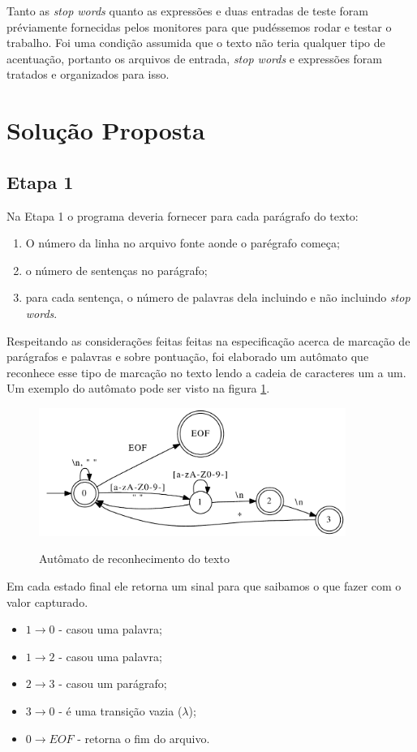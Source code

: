 \documentclass[12pt]{article}
\begin{document}
Tanto as \textit{stop words} quanto as expressões e duas entradas de teste foram préviamente fornecidas pelos monitores para que pudéssemos rodar e testar o trabalho. Foi uma condição assumida que o texto não teria qualquer tipo de acentuação, portanto os arquivos de entrada, \textit{stop words} e expressões foram tratados e organizados para isso.

\section{Solução Proposta}
\label{solucao_proposta}

\subsection{Etapa 1}
\label{etpu}
Na Etapa 1 o programa deveria fornecer para cada parágrafo do texto:
\begin{enumerate}
  \item O número da linha no arquivo fonte aonde o parégrafo começa;
  \item o número de sentenças no parágrafo;
  \item para cada sentença, o número de palavras dela incluindo e não incluindo \textit{stop words}.	
\end{enumerate}

Respeitando as considerações feitas feitas na especificação acerca de marcação de parágrafos e palavras e sobre pontuação, foi elaborado um autômato que reconhece esse tipo de marcação no texto lendo a cadeia de caracteres um a um. Um exemplo do autômato pode ser visto na figura \ref{img:automato}.

\begin{figure}[ht!]
\centering
\includegraphics[width=10.0cm]{automato.pdf}
\label{img:automato}
\caption{Autômato de reconhecimento do texto}
\end{figure}

Em cada estado final ele retorna um sinal para que saibamos o que fazer com o valor capturado.
\begin{itemize}
  \item $1 \longrightarrow 0$ - casou uma palavra;
  \item $1 \longrightarrow 2$ - casou uma palavra;
  \item $2 \longrightarrow 3$ - casou um parágrafo;
  \item $3 \longrightarrow 0$ - é uma transição vazia ($\lambda$);
  \item $0 \longrightarrow EOF$ - retorna o fim do arquivo.
\end{itemize}
\end{document}
